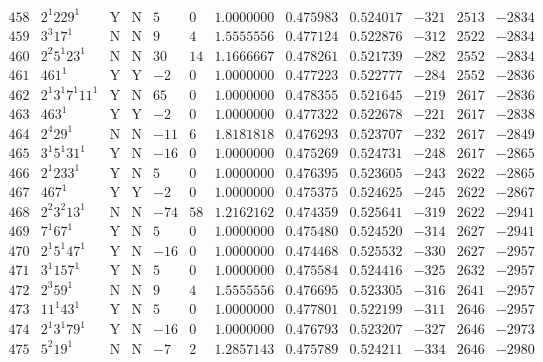 \documentclass[11pt,reqno,a4letter]{article}
\numberwithin{figure}{section}
\numberwithin{table}{section}
\theoremstyle{plain}
\numberwithin{theorem}{section}
\theoremstyle{definition}
\begin{document}
\begin{table}[h!]
\begin{equation*}
{\begin{array}{cc|cc|ccc|cc|ccc}
 458 & 2^1 229^1 & \text{Y} & \text{N} & 5 & 0 & 1.0000000 & 0.475983 & 0.524017 & -321 & 2513 & -2834 \\
 459 & 3^3 17^1 & \text{N} & \text{N} & 9 & 4 & 1.5555556 & 0.477124 & 0.522876 & -312 & 2522 & -2834 \\
 460 & 2^2 5^1 23^1 & \text{N} & \text{N} & 30 & 14 & 1.1666667 & 0.478261 & 0.521739 & -282 & 2552 & -2834 \\
 461 & 461^1 & \text{Y} & \text{Y} & -2 & 0 & 1.0000000 & 0.477223 & 0.522777 & -284 & 2552 & -2836 \\
 462 & 2^1 3^1 7^1 11^1 & \text{Y} & \text{N} & 65 & 0 & 1.0000000 & 0.478355 & 0.521645 & -219 & 2617 & -2836 \\
 463 & 463^1 & \text{Y} & \text{Y} & -2 & 0 & 1.0000000 & 0.477322 & 0.522678 & -221 & 2617 & -2838 \\
 464 & 2^4 29^1 & \text{N} & \text{N} & -11 & 6 & 1.8181818 & 0.476293 & 0.523707 & -232 & 2617 & -2849 \\
 465 & 3^1 5^1 31^1 & \text{Y} & \text{N} & -16 & 0 & 1.0000000 & 0.475269 & 0.524731 & -248 & 2617 & -2865 \\
 466 & 2^1 233^1 & \text{Y} & \text{N} & 5 & 0 & 1.0000000 & 0.476395 & 0.523605 & -243 & 2622 & -2865 \\
 467 & 467^1 & \text{Y} & \text{Y} & -2 & 0 & 1.0000000 & 0.475375 & 0.524625 & -245 & 2622 & -2867 \\
 468 & 2^2 3^2 13^1 & \text{N} & \text{N} & -74 & 58 & 1.2162162 & 0.474359 & 0.525641 & -319 & 2622 & -2941 \\
 469 & 7^1 67^1 & \text{Y} & \text{N} & 5 & 0 & 1.0000000 & 0.475480 & 0.524520 & -314 & 2627 & -2941 \\
 470 & 2^1 5^1 47^1 & \text{Y} & \text{N} & -16 & 0 & 1.0000000 & 0.474468 & 0.525532 & -330 & 2627 & -2957 \\
 471 & 3^1 157^1 & \text{Y} & \text{N} & 5 & 0 & 1.0000000 & 0.475584 & 0.524416 & -325 & 2632 & -2957 \\
 472 & 2^3 59^1 & \text{N} & \text{N} & 9 & 4 & 1.5555556 & 0.476695 & 0.523305 & -316 & 2641 & -2957 \\
 473 & 11^1 43^1 & \text{Y} & \text{N} & 5 & 0 & 1.0000000 & 0.477801 & 0.522199 & -311 & 2646 & -2957 \\
 474 & 2^1 3^1 79^1 & \text{Y} & \text{N} & -16 & 0 & 1.0000000 & 0.476793 & 0.523207 & -327 & 2646 & -2973 \\
 475 & 5^2 19^1 & \text{N} & \text{N} & -7 & 2 & 1.2857143 & 0.475789 & 0.524211 & -334 & 2646 & -2980 \\

\end{array}}
\end{equation*}
\end{table}
\end{document}
